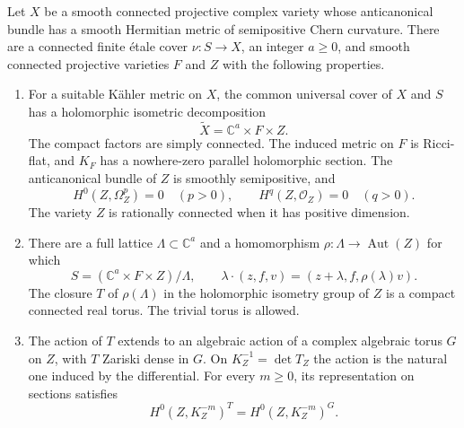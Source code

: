 \begin{theorem}
\label{thm:structure}
Let $X$ be a smooth connected projective complex variety whose
anticanonical bundle has a smooth Hermitian metric of semipositive
Chern curvature.  There are a connected finite \'etale cover
$\nu:S\to X$, an integer $a\geq0$, and smooth connected projective
varieties $F$ and $Z$ with the following properties.
\begin{enumerate}
\item For a suitable K\"ahler metric on $X$, the common universal cover
of $X$ and $S$ has a holomorphic isometric decomposition
\begin{equation}\label{eq:cover-product}
             \widetilde X=\mathbb C^a\times F\times Z.
\end{equation}
The compact factors are simply connected.  The induced metric on $F$
is Ricci-flat, and $K_F$ has a nowhere-zero parallel holomorphic section.
The anticanonical bundle of $Z$ is smoothly semipositive, and
\begin{equation}\label{eq:cover-noforms}
 H^0(Z,\Omega_Z^p)=0\quad(p>0),\qquad
 H^q(Z,\mathcal O_Z)=0\quad(q>0).
\end{equation}
The variety $Z$ is rationally connected when it has positive dimension.

\item There are a full lattice $\Lambda\subset\mathbb C^a$ and a
homomorphism $\rho:\Lambda\to\operatorname{Aut}(Z)$ for which
\begin{equation}\label{eq:cover-action}
 S=(\mathbb C^a\times F\times Z)/\Lambda,\qquad
 \lambda\cdot(z,f,v)=(z+\lambda,f,\rho(\lambda)v).
\end{equation}
The closure $T$ of $\rho(\Lambda)$ in the holomorphic isometry group
of $Z$ is a compact connected real torus.  The trivial torus is allowed.

\item The action of $T$ extends to an algebraic action of a complex
algebraic torus $G$ on $Z$, with $T$ Zariski dense in $G$.
On $K_Z^{-1}=\det T_Z$ the action is the natural one induced by the
differential.  For every $m\geq0$, its representation on sections satisfies
\begin{equation}\label{eq:cover-invariants}
       H^0(Z,K_Z^{-m})^T=H^0(Z,K_Z^{-m})^G.
\end{equation}


\end{enumerate}
\end{theorem}
